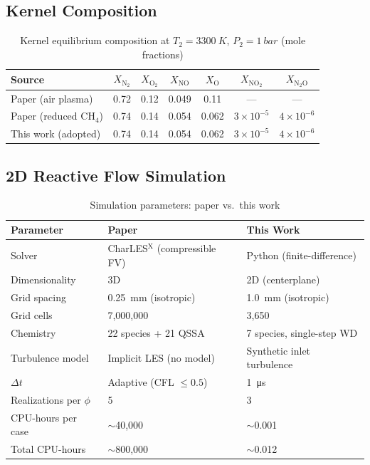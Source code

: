 \documentclass[11pt]{article}
\begin{document}
\subsection{Kernel Composition}
\begin{table}[H]
\centering
\caption{Kernel equilibrium composition at $T_2 = \SI{3300}{K}$, $P_2 = \SI{1}{bar}$ (mole fractions)}
\label{tab:composition}
\small
\begin{tabular}{@{}lcccccc@{}}
\toprule
\textbf{Source} & $X_{\mathrm{N}_2}$ & $X_{\mathrm{O}_2}$ & $X_{\mathrm{NO}}$ & $X_{\mathrm{O}}$ & $X_{\mathrm{NO}_2}$ & $X_{\mathrm{N}_2\mathrm{O}}$ \\
\midrule
Paper (air plasma) & 0.72 & 0.12 & 0.049 & 0.11 & --- & --- \\
Paper (reduced CH$_4$) & 0.74 & 0.14 & 0.054 & 0.062 & $3\times10^{-5}$ & $4\times10^{-6}$ \\
This work (adopted) & 0.74 & 0.14 & 0.054 & 0.062 & $3\times10^{-5}$ & $4\times10^{-6}$ \\
\bottomrule
\end{tabular}
\end{table}

\subsection{2D Reactive Flow Simulation}

\begin{table}[H]
\centering
\caption{Simulation parameters: paper vs.\ this work}
\label{tab:sim_params}
\small
\begin{tabular}{@{}lll@{}}
\toprule
\textbf{Parameter} & \textbf{Paper} & \textbf{This Work} \\
\midrule
Solver & CharLES$^{\mathrm{X}}$ (compressible FV) & Python (finite-difference) \\
Dimensionality & 3D & 2D (centerplane) \\
Grid spacing & \SI{0.25}{mm} (isotropic) & \SI{1.0}{mm} (isotropic) \\
Grid cells & 7,000,000 & 3,650 \\
Chemistry & 22 species + 21 QSSA & 7 species, single-step WD \\
Turbulence model & Implicit LES (no model) & Synthetic inlet turbulence \\
$\Delta t$ & Adaptive (CFL $\leq 0.5$) & \SI{1}{\micro s} \\
Realizations per $\phi$ & 5 & 3 \\
CPU-hours per case & $\sim$40,000 & $\sim$0.001 \\
Total CPU-hours & $\sim$800,000 & $\sim$0.012 \\
\bottomrule
\end{tabular}
\end{table}
\end{document}
